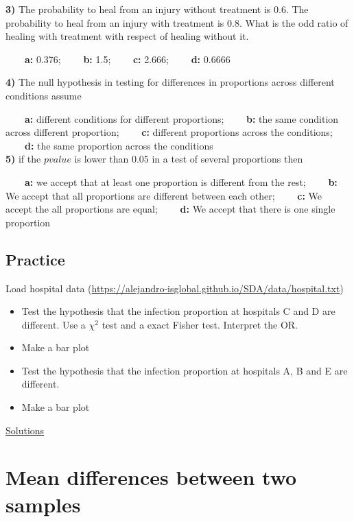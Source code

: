 \documentclass[
]{book}
\begin{document}
\textbf{3)} The probability to heal from an injury without treatment is 0.6. The probability to heal from an injury with treatment is 0.8. What is the odd ratio of healing with treatment with respect of healing without it.

\textbf{\(\qquad\)a:} 0.376;
\textbf{\(\qquad\)b:} 1.5;
\textbf{\(\qquad\)c:} 2.666;
\textbf{\(\qquad\)d:} 0.6666

\textbf{4)} The null hypothesis in testing for differences in proportions across different conditions assume

\textbf{\(\qquad\)a:} different conditions for different proportions;
\textbf{\(\qquad\)b:} the same condition across different proportion;
\textbf{\(\qquad\)c:} different proportions across the conditions;
\textbf{\(\qquad\)d:} the same proportion across the conditions\\
\textbf{5)} if the \(pvalue\) is lower than \(0.05\) in a test of several proportions then

\textbf{\(\qquad\)a:} we accept that at least one proportion is different from the rest;
\textbf{\(\qquad\)b:} We accept that all proportions are different between each other;
\textbf{\(\qquad\)c:} We accept the all proportions are equal;
\textbf{\(\qquad\)d:} We accept that there is one single proportion

\hypertarget{practice-5}{%
\section{Practice}\label{practice-5}}

Load hospital data (\url{https://alejandro-isglobal.github.io/SDA/data/hospital.txt})

\begin{itemize}
\item
  Test the hypothesis that the infection proportion at hospitals C and D are different. Use a \(\chi^2\) test and a exact Fisher test. Interpret the OR.
\item
  Make a bar plot
\item
  Test the hypothesis that the infection proportion at hospitals A, B and E are different.
\item
  Make a bar plot
\end{itemize}

\href{https://colab.research.google.com/drive/1qHNmibyg9L7v8NcO3HHmknIGxt6_77KK?usp=sharing}{Solutions}

\hypertarget{mean-differences-between-two-samples}{%
\chapter{Mean differences between two samples}\label{mean-differences-between-two-samples}}
\end{document}
